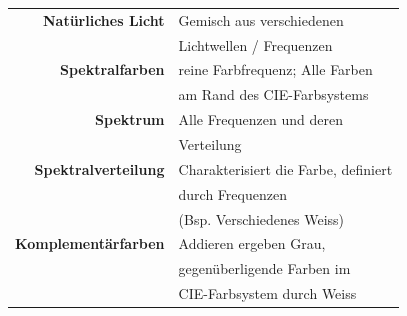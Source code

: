 \begin{tabular}{r|l}
    \textbf{Natürliches Licht}  & Gemisch aus verschiedenen \\
                                & Lichtwellen / Frequenzen \\
    \textbf{Spektralfarben}     & reine Farbfrequenz; Alle Farben \\
                                & am Rand des CIE-Farbsystems \\
    \textbf{Spektrum}           & Alle Frequenzen und deren \\
                                & Verteilung \\
    \textbf{Spektralverteilung} & Charakterisiert die Farbe, definiert \\
                                & durch Frequenzen \\
                                & (Bsp. Verschiedenes Weiss) \\
    \textbf{Komplementärfarben} & Addieren ergeben Grau, \\
                                & gegenüberligende Farben im \\
                                & CIE-Farbsystem durch Weiss
\end{tabular}
